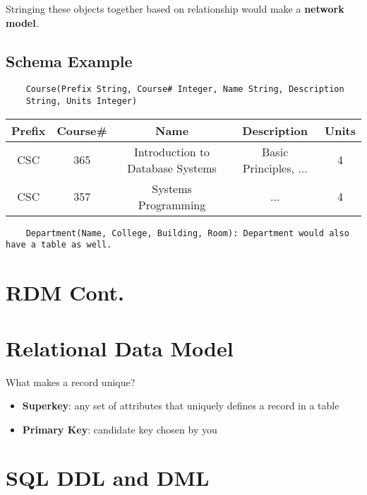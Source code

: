 \documentclass[twoside]{article}
\begin{document}
Stringing these objects together based on relationship would 
make a \textbf{network model}.

\subsection*{Schema Example}
\begin{verbatim}
    Course(Prefix String, Course# Integer, Name String, Description
    String, Units Integer)
\end{verbatim}

\begin{table}[h]
    \centering
    \begin{tabular}{|c|c|c|c|c|}
        \hline
        Prefix & Course\# & Name & Description & Units \\
        \hline
        CSC & 365 & Introduction to Database Systems & Basic Principles, ... & 4 \\
        \hline
        CSC & 357 & Systems Programming & ... & 4 \\
        \hline
    \end{tabular}
\end{table}

\begin{verbatim}
    Department(Name, College, Building, Room): Department would also have a table as well.
\end{verbatim}

\newpage
\section{RDM Cont.}

\section*{Relational Data Model}

What makes a record unique?
\begin{itemize}
    \item \textbf{Superkey}: any set of attributes that uniquely defines a 
    record in a table
    \item \textbf{Primary Key}: candidate key chosen by you
\end{itemize}

\newpage
\section{SQL DDL and DML}
\end{document}
